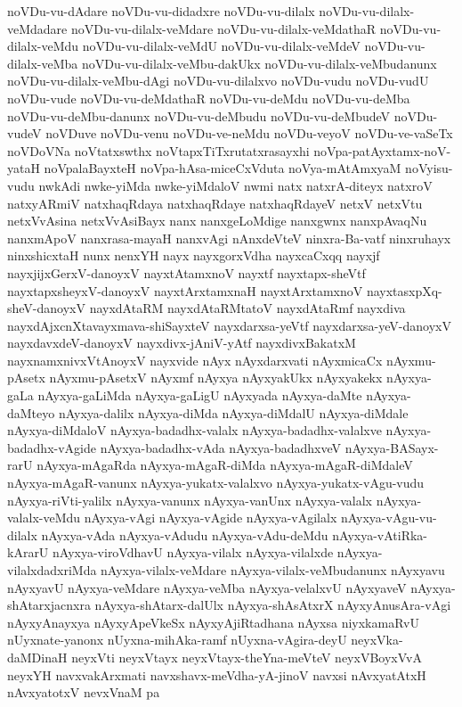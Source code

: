 {noVDu-vu-dAdare
noVDu-vu-didadxre
noVDu-vu-dilalx
noVDu-vu-dilalx-veMdadare
noVDu-vu-dilalx-veMdare
noVDu-vu-dilalx-veMdathaR
noVDu-vu-dilalx-veMdu
noVDu-vu-dilalx-veMdU
noVDu-vu-dilalx-veMdeV
noVDu-vu-dilalx-veMba
noVDu-vu-dilalx-veMbu-dakUkx
noVDu-vu-dilalx-veMbudanunx
noVDu-vu-dilalx-veMbu-dAgi
noVDu-vu-dilalxvo
noVDu-vudu
noVDu-vudU
noVDu-vude
noVDu-vu-deMdathaR
noVDu-vu-deMdu
noVDu-vu-deMba
noVDu-vu-deMbu-danunx
noVDu-vu-deMbudu
noVDu-vu-deMbudeV
noVDu-vudeV
noVDuve
noVDu-venu
noVDu-ve-neMdu
noVDu-veyoV
noVDu-ve-vaSeTx
noVDoVNa
noVtatxswthx
noVtapxTiTxrutatxrasayxhi
noVpa-patAyxtamx-noV-yataH
noVpalaBayxteH
noVpa-hAsa-miceCxVduta
noVya-mAtAmxyaM
noVyisu-vudu
nwkAdi
nwke-yiMda
nwke-yiMdaloV
nwmi
natx
natxrA-diteyx
natxroV
natxyARmiV
natxhaqRdaya
natxhaqRdaye
natxhaqRdayeV
netxV
netxVtu
netxVvAsina
netxVvAsiBayx
nanx
nanxgeLoMdige
nanxgwnx
nanxpAvaqNu
nanxmApoV
nanxrasa-mayaH
nanxvAgi
nAnxdeVteV
ninxra-Ba-vatf
ninxruhayx
ninxshicxtaH
nunx
nenxYH
nayx
nayxgorxVdha
nayxcaCxqq
nayxjf
nayxjijxGerxV-danoyxV
nayxtAtamxnoV
nayxtf
nayxtapx-sheVtf
nayxtapxsheyxV-danoyxV
nayxtArxtamxnaH
nayxtArxtamxnoV
nayxtasxpXq-sheV-danoyxV
nayxdAtaRM
nayxdAtaRMtatoV
nayxdAtaRmf
nayxdiva
nayxdAjxcnXtavayxmava-shiSayxteV
nayxdarxsa-yeVtf
nayxdarxsa-yeV-danoyxV
nayxdavxdeV-danoyxV
nayxdivx-jAniV-yAtf
nayxdivxBakatxM
nayxnamxnivxVtAnoyxV
nayxvide
nAyx
nAyxdarxvati
nAyxmicaCx
nAyxmu-pAsetx
nAyxmu-pAsetxV
nAyxmf
nAyxya
nAyxyakUkx
nAyxyakekx
nAyxya-gaLa
nAyxya-gaLiMda
nAyxya-gaLigU
nAyxyada
nAyxya-daMte
nAyxya-daMteyo
nAyxya-dalilx
nAyxya-diMda
nAyxya-diMdalU
nAyxya-diMdale
nAyxya-diMdaloV
nAyxya-badadhx-valalx
nAyxya-badadhx-valalxve
nAyxya-badadhx-vAgide
nAyxya-badadhx-vAda
nAyxya-badadhxveV
nAyxya-BASayx-rarU
nAyxya-mAgaRda
nAyxya-mAgaR-diMda
nAyxya-mAgaR-diMdaleV
nAyxya-mAgaR-vanunx
nAyxya-yukatx-valalxvo
nAyxya-yukatx-vAgu-vudu
nAyxya-riVti-yalilx
nAyxya-vanunx
nAyxya-vanUnx
nAyxya-valalx
nAyxya-valalx-veMdu
nAyxya-vAgi
nAyxya-vAgide
nAyxya-vAgilalx
nAyxya-vAgu-vu-dilalx
nAyxya-vAda
nAyxya-vAdudu
nAyxya-vAdu-deMdu
nAyxya-vAtiRka-kArarU
nAyxya-viroVdhavU
nAyxya-vilalx
nAyxya-vilalxde
nAyxya-vilalxdadxriMda
nAyxya-vilalx-veMdare
nAyxya-vilalx-veMbudanunx
nAyxyavu
nAyxyavU
nAyxya-veMdare
nAyxya-veMba
nAyxya-velalxvU
nAyxyaveV
nAyxya-shAtarxjacnxra
nAyxya-shAtarx-dalUlx
nAyxya-shAsAtxrX
nAyxyAnusAra-vAgi
nAyxyAnayxya
nAyxyApeVkeSx
nAyxyAjiRtadhana
nAyxsa
niyxkamaRvU
nUyxnate-yanonx
nUyxna-mihAka-ramf
nUyxna-vAgira-deyU
neyxVka-daMDinaH
neyxVti
neyxVtayx
neyxVtayx-theYna-meVteV
neyxVBoyxVvA
neyxYH
navxvakArxmati
navxshavx-meVdha-yA-jinoV
navxsi
nAvxyatAtxH
nAvxyatotxV
nevxVnaM
pa
}

